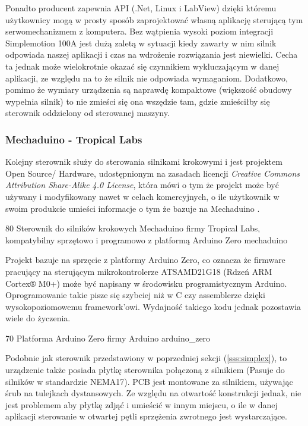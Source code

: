 Ponadto producent zapewnia API (.Net, Linux i LabView) dzięki któremu użytkownicy mogą w prosty sposób zaprojektować własną aplikację sterującą tym serwomechanizmem z komputera. Bez wątpienia wysoki poziom integracji Simplemotion 100A jest dużą zaletą w sytuacji kiedy zawarty w nim silnik odpowiada naszej aplikacji i czas na wdrożenie rozwiązania jest niewielki. Cecha ta jednak może wielokrotnie okazać się czynnikiem wykluczającym w danej aplikacji, ze względu na to że silnik nie odpowiada wymaganiom. Dodatkowo, pomimo że wymiary urządzenia są naprawdę kompaktowe (większość obudowy wypełnia silnik) to nie zmieści się ona wszędzie tam, gdzie zmieściłby się sterownik oddzielony od sterowanej maszyny.

\subsubsection{Mechaduino - Tropical Labs}
\label{ss:mechaduino}

Kolejny sterownik służy do sterowania silnikami krokowymi i jest projektem Open Source/ Hardware, udostępnionym na zasadach licencji {\it Creative Commons Attribution Share-Alike 4.0 License}, która mówi o tym że projekt może być używany i modyfikowany nawet w celach komercyjnych, o ile użytkownik w swoim produkcie umieści informacje o tym że bazuje na Mechaduino \cite{crcommons}.  

	{80}
	{Sterownik do silników krokowych Mechaduino firmy Tropical Labs, kompatybilny sprzętowo i programowo z platformą Arduino Zero}
	{mechaduino}
	
Projekt bazuje na sprzęcie z platformy Arduino Zero, co oznacza że firmware pracujący na sterującym mikrokontrolerze ATSAMD21G18 (Rdzeń ARM Cortex® M0+) może być napisany w środowisku programistycznym Arduino. Oprogramowanie takie pisze się szybciej niż w C czy assemblerze dzięki wysokopoziomowemu framework'owi. Wydajność takiego kodu jednak pozostawia wiele do życzenia.

	{70}
	{Platforma Arduino Zero firmy Arduino}
	{arduino_zero}
	
Podobnie jak sterownik przedstawiony w poprzedniej sekcji (\ref{sss:simplex}), to urządzenie także posiada płytkę sterownika połączoną z silnikiem (Pasuje do silników w standardzie NEMA17). PCB jest montowane za silnikiem, używając śrub na tulejkach dystansowych. Ze względu na otwartość konstrukcji jednak, nie jest problemem aby płytkę zdjąć i umieścić w innym miejscu, o ile w danej aplikacji sterowanie w otwartej pętli sprzężenia zwrotnego jest wystarczające. 

